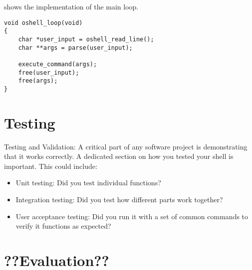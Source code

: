 \documentclass[12pt,english]{article}
\begin{document}
 shows the implementation of the main loop.
\begin{verbatim}
void oshell_loop(void)
{
    char *user_input = oshell_read_line();
    char **args = parse(user_input);

    execute_command(args);
    free(user_input);
    free(args);
}
\end{verbatim}
\label{mnt:oshellLoop}

\section{Testing}
Testing and Validation: A critical part of any software project is demonstrating that it works correctly. A dedicated section on how you tested your shell is important. This could include:

\begin{itemize}
\item Unit testing: Did you test individual functions?

\item Integration testing: Did you test how different parts work together?

\item User acceptance testing: Did you run it with a set of common commands to verify it functions as expected?
\end{itemize}
\section{??Evaluation??}
\end{document}
